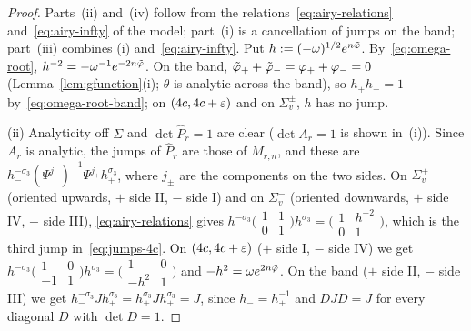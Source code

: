 \begin{proof}
Parts~(ii) and~(iv) follow from the relations~\eqref{eq:airy-relations} and~\eqref{eq:airy-infty} of the model; part~(i)
is a cancellation of jumps on the band; part~(iii) combines (i) and~\eqref{eq:airy-infty}. Put
$h:=(-\omega)^{1/2}e^{n\tilde\varphi}$. By~\eqref{eq:omega-root}, $h^{-2}=-\omega^{-1}e^{-2n\tilde\varphi}$. On the band,
$\tilde\varphi_++\tilde\varphi_-=\varphi_++\varphi_-=0$ (Lemma~\ref{lem:gfunction}(i); $\theta$ is analytic across the band), so
$h_+h_-=1$ by~\eqref{eq:omega-root-band}; on $(4c,4c+\varepsilon)$ and on $\Sigma_v^\pm$, $h$ has no jump.

(ii) Analyticity off $\Sigma$ and $\det\hat P_r=1$ are clear ($\det A_r=1$ is shown in~(i)). Since $A_r$ is analytic, the jumps of
$\hat P_r$ are those of $M_{r,n}$, and these are $h_-^{-\sigma_3}(\Psi^{j_-})^{-1}\Psi^{j_+}h_+^{\sigma_3}$, where $j_\pm$ are the
components on the two sides. On $\Sigma_v^+$ (oriented upwards, $+$ side II, $-$ side I) and on $\Sigma_v^-$ (oriented
downwards, $+$ side IV, $-$ side III), \eqref{eq:airy-relations} gives $h^{-\sigma_3}\bigl(\begin{smallmatrix}1&1\\0&1\end{smallmatrix}\bigr)h^{\sigma_3}
=\bigl(\begin{smallmatrix}1&h^{-2}\\0&1\end{smallmatrix}\bigr)$, which is the third jump in~\eqref{eq:jumps-4c}. On
$(4c,4c+\varepsilon)$ ($+$ side I, $-$ side IV) we get $h^{-\sigma_3}\bigl(\begin{smallmatrix}1&0\\-1&1\end{smallmatrix}\bigr)h^{\sigma_3}
=\bigl(\begin{smallmatrix}1&0\\-h^2&1\end{smallmatrix}\bigr)$ and $-h^2=\omega e^{2n\tilde\varphi}$. On the band ($+$ side II,
$-$ side III) we get $h_-^{-\sigma_3}Jh_+^{\sigma_3}=h_+^{\sigma_3}Jh_+^{\sigma_3}=J$, since $h_-=h_+^{-1}$ and $DJD=J$ for every
diagonal $D$ with $\det D=1$.


\end{proof}

